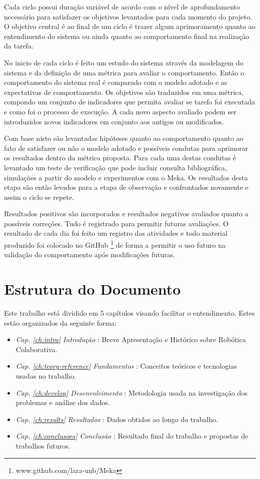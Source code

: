 Cada ciclo possui duração variável de acordo com o nível de aprofundamento necessário para satisfazer os objetivos levantados para cada momento do projeto. O objetivo central é ao final de um ciclo é trazer algum aprimoramento quanto ao entendimento do sistema ou ainda quanto ao comportamento final na realização da tarefa.

No inicio de cada ciclo é feito um estudo do sistema através da modelagem do sistema e da definição de uma métrica para avaliar o comportamento. Então o comportamento do sistema real é comparado com o modelo adotado e as expectativas de comportamento. Os objetivos são traduzidos em uma métrica, compondo um conjunto de indicadores que permita avaliar se tarefa foi executada e como foi o processo de execução. A cada novo aspecto avaliado podem ser introduzidos novos indicadores em conjunto aos antigos ou modificados. 

Com base nisto são levantadas hipóteses quanto ao comportamento quanto ao fato de satisfazer ou não o modelo adotado e possíveis condutas para aprimorar os resultados dentro da métrica proposta. Para cada uma destas condutas é levantado um teste de verificação que pode incluir consulta bibliográfica, simulações a partir do modelo e experimentos com o Meka. Os resultados desta etapa são então levados para a etapa de observação e confrontados novamente e assim o ciclo se repete.

Resultados positivos são incorporados e resultados negativos avaliados quanto a possíveis correções. Tudo é registrado para permitir futuras avaliações. O resultado de cada dia foi feito um registro das atividades e todo material produzido foi colocado no GitHub \footnote{www.github.com/lara-unb/Meka} de forma a permitir o uso futuro na validação do comportamento após modificações futuras.

\section{Estrutura do Documento}

Este trabalho está dividido em 5 capítulos visando facilitar o entendimento. Estes estão organizados da seguinte forma:

\begin{itemize}
    \item \textit{Cap. \ref{ch:intro} Introdução} : Breve Apresentação e Histórico sobre Robótica Colaborativa.
    \item \textit{Cap. \ref{ch:teory-reference} Fundamentos} : Conceitos teóricos e tecnologias usadas no trabalho.
    \item \textit{Cap. \ref{ch:develop} Desenvolvimento} : Metodologia usada na investigação dos problemas e análise dos dados.
    \item \textit{Cap. \ref{ch:results} Resultados} : Dados obtidos ao longo do trabalho.
    \item \textit{Cap. \ref{ch:conclusoes} Conclusão} : Resultado final do trabalho e propostas de trabalhos futuros.
\end{itemize}

